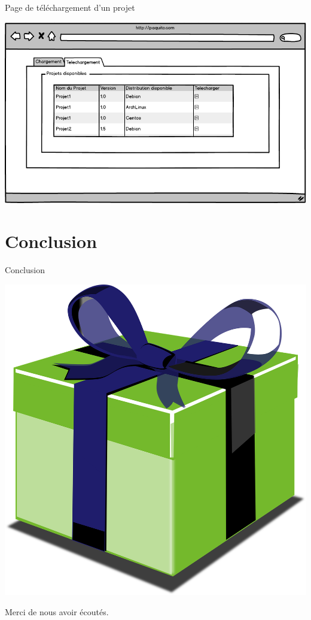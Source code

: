 \documentclass[9pt,xcolor=dvipsnames]{beamer}
\begin{document}
\begin{frame}{Page de téléchargement d'un projet}
  \begin{center}
    \includegraphics[scale=\largeur]{../img/telechargerProjet.png}
  \end{center}
\end{frame}

\section*{Conclusion}
\begin{frame}{Conclusion}
	\begin{center}
		\includegraphics[scale=0.1]{../img/paquito.png}
	
		Merci de nous avoir écoutés. 

	\end{center}
\end{frame}
\end{document}
